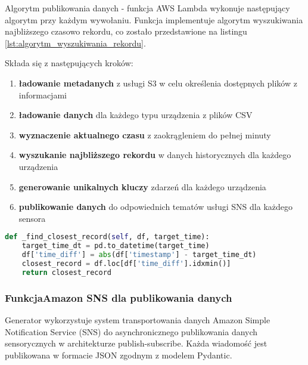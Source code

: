 Algorytm publikowania danych - funkcja AWS Lambda wykonuje następujący algorytm przy każdym wywołaniu. Funkcja implementuje algorytm wyszukiwania najbliższego czasowo rekordu, co zostało przedstawione na listingu \ref{lst:algorytm_wyszukiwania_rekordu}. 

\vspace{0.3em}

Składa się z następujących kroków:

\begin{enumerate}
    \item \textbf{ładowanie metadanych} z usługi S3 w celu określenia dostępnych plików z informacjami
    \item \textbf{ładowanie danych} dla każdego typu urządzenia z plików CSV
    \item \textbf{wyznaczenie aktualnego czasu} z zaokrągleniem do pełnej minuty
    \item \textbf{wyszukanie najbliższego rekordu} w danych historycznych dla każdego urządzenia
    \item \textbf{generowanie unikalnych kluczy} zdarzeń dla każdego urządzenia
    \item \textbf{publikowanie danych} do odpowiednich tematów usługi SNS dla każdego sensora
\end{enumerate}

\vspace{0.3em}

\begin{lstlisting}[language=Python, caption=Algorytm wyszukiwania najbliższego rekordu, label={lst:algorytm_wyszukiwania_rekordu}]
def _find_closest_record(self, df, target_time):
    target_time_dt = pd.to_datetime(target_time)
    df['time_diff'] = abs(df['timestamp'] - target_time_dt)
    closest_record = df.loc[df['time_diff'].idxmin()]
    return closest_record
\end{lstlisting}

\subsubsection{FunkcjaAmazon SNS dla publikowania danych}
\label{subsec:amazon_sns}

Generator wykorzystuje system transportowania danych Amazon Simple Notification Service (SNS) do asynchronicznego publikowania danych sensorycznych w architekturze publish-subscribe. Każda wiadomość jest publikowana w formacie JSON zgodnym z modelem Pydantic.

\vspace{0.3em}

